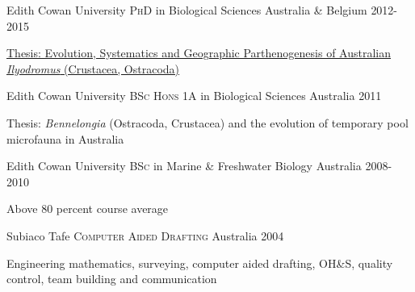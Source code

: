 

\begin{cventries}

  \cventry
    {Edith Cowan University} %
    {\textsc{PhD} in Biological Sciences} %
    {Australia \& Belgium} %
    {2012-2015} %
    {
      \begin{cvitems} %
        \item {\href{http://ro.ecu.edu.au/theses_ebooks/1/}{Thesis: Evolution, Systematics and Geographic Parthenogenesis of Australian \textit{Ilyodromus} (Crustacea, Ostracoda)}}
      \end{cvitems}
    }

  \cventry
    {Edith Cowan University} %
    {\textsc{BSc Hons 1A} in Biological Sciences} %
    {Australia} %
    {2011} %
    {
   	  \begin{cvitems} %
  		 \item {Thesis: \textit{Bennelongia} (Ostracoda, Crustacea) and the evolution of temporary pool microfauna in Australia}
   	  \end{cvitems}
    }
  
  \cventry
  {Edith Cowan University} %
  {\textsc{BSc} in Marine \& Freshwater Biology} %
  {Australia} %
  {2008-2010} %
  {
  	\begin{cvitems} %
  		\item {Above 80 percent course average}
  	\end{cvitems}
  }
  
  \cventry
  {Subiaco Tafe} %
  {\textsc{Computer Aided Drafting}} %
  {Australia} %
  {2004} %
  {
  	\begin{cvitems} %
  		\item {Engineering mathematics, surveying, computer aided drafting, OH\&S, quality control, team building and communication}
  	\end{cvitems}
  }
  
\end{cventries}
